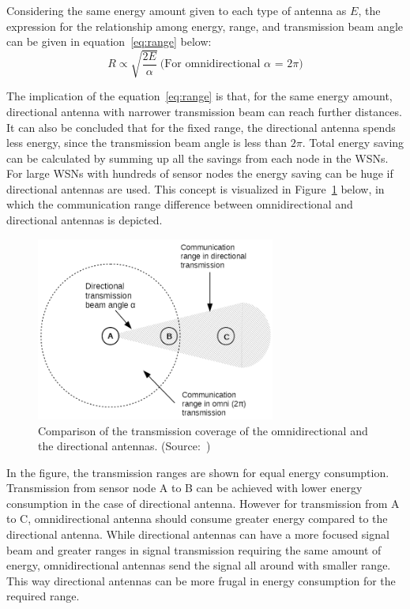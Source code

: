 \documentclass[12pt, oneandhalf, chaparabic, sees, ms]{metu}
\begin{document}
Considering the same energy amount given to each type of antenna as $E$, the expression for the relationship among energy, range, and transmission beam angle can be given in equation~\ref{eq:range} below:
\begin{equation}
R \propto \sqrt{\frac{2 E} {\alpha}}~\text{(For omnidirectional $\alpha$ = 2$\pi$)} \label{eq:range}
\end{equation}

The implication of the equation~\ref{eq:range} is that, for the same energy amount, directional antenna with narrower transmission beam can reach further distances.
It can also be concluded that for the fixed range, the directional antenna spends less energy, since the transmission beam angle is less than $2\pi$. 
Total energy saving can be calculated by summing up all the savings from each node in the WSNs. For large WSNs with hundreds of sensor nodes the energy 
saving can be huge if directional antennas are used. This concept is visualized in Figure~\ref{fig:comm-cover} below, in which
the communication range difference between omnidirectional and directional antennas 
is depicted. 
\vspace{-0.1cm}
% 
%
%
\begin{figure}[!htbp]
 \begin{center}
  \includegraphics[width=0.7\textwidth]{comm-cover.png}
 \end{center}
 \caption{Comparison of the transmission coverage of the omnidirectional and the directional antennas. (Source:~\protect\cite[p.~308]{corderio2006})}
  \label{fig:comm-cover}
\end{figure}
% 
%
%
%

\newpage

In the figure, the transmission ranges are shown for equal energy consumption.  
Transmission from sensor node A to B can be achieved with lower energy consumption in the case of directional antenna.
However for transmission from A to C, omnidirectional antenna should consume greater energy compared to the directional antenna.
While directional antennas can have a more focused signal beam and greater ranges in signal transmission requiring the same amount of energy, 
omnidirectional antennas send the signal all around with smaller range. This way directional antennas can be more frugal in energy consumption for the required range.
\end{document}
